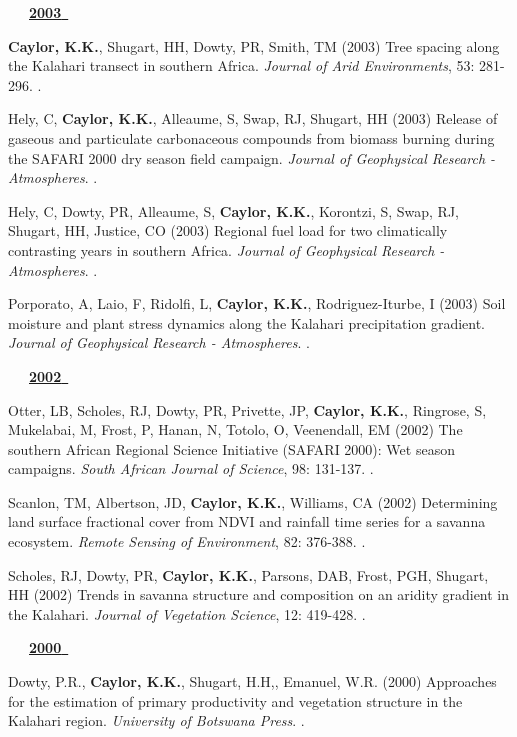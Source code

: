 \begin{etaremune}
\vspace{0.1in}
\mbox{\ \ \ \underline{\textbf{2003 }}}
\vspace{0.1in}

\item \textbf{ Caylor, K.K.}, Shugart, HH, Dowty, PR, Smith, TM (2003) Tree spacing along the Kalahari transect in southern Africa. \emph{Journal of Arid Environments}, 53: 281-296. .
\item Hely, C, \textbf{ Caylor, K.K.}, Alleaume, S, Swap, RJ, Shugart, HH (2003) Release of gaseous and particulate carbonaceous compounds from biomass burning during the SAFARI 2000 dry season field campaign. \emph{Journal of Geophysical Research - Atmospheres}. .
\item Hely, C, Dowty, PR, Alleaume, S, \textbf{ Caylor, K.K.}, Korontzi, S, Swap, RJ, Shugart, HH, Justice, CO (2003) Regional fuel load for two climatically contrasting years in southern Africa. \emph{Journal of Geophysical Research - Atmospheres}. .
\item Porporato, A, Laio, F, Ridolfi, L, \textbf{ Caylor, K.K.}, Rodriguez-Iturbe, I (2003) Soil moisture and plant stress dynamics along the Kalahari precipitation gradient. \emph{Journal of Geophysical Research - Atmospheres}. .

\vspace{0.1in}
\mbox{\ \ \ \underline{\textbf{2002 }}}
\vspace{0.1in}

\item Otter, LB, Scholes, RJ, Dowty, PR, Privette, JP, \textbf{ Caylor, K.K.}, Ringrose, S, Mukelabai, M, Frost, P, Hanan, N, Totolo, O, Veenendall, EM (2002) The southern African Regional Science Initiative (SAFARI 2000): Wet season campaigns. \emph{South African Journal of Science}, 98: 131-137. \doi{-}.
\item Scanlon, TM, Albertson, JD, \textbf{ Caylor, K.K.}, Williams, CA (2002) Determining land surface fractional cover from NDVI and rainfall time series for a savanna ecosystem. \emph{Remote Sensing of Environment}, 82: 376-388. .
\item Scholes, RJ, Dowty, PR, \textbf{ Caylor, K.K.}, Parsons, DAB, Frost, PGH, Shugart, HH (2002) Trends in savanna structure and composition on an aridity gradient in the Kalahari. \emph{Journal of Vegetation Science}, 12: 419-428. .

\vspace{0.1in}
\mbox{\ \ \ \underline{\textbf{2000 }}}
\vspace{0.1in}

\item Dowty, P.R., \textbf{ Caylor, K.K.}, Shugart, H.H,, Emanuel, W.R. (2000) Approaches for the estimation of primary productivity and vegetation structure in the Kalahari region. \emph{University of Botswana Press}. \doi{-}.

\end{etaremune}
